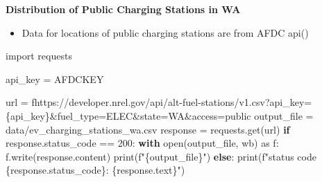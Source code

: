 \documentclass[
  letterpaper,
  DIV=11,
  numbers=noendperiod]{scrartcl}
\newenvironment{Shaded}{\begin{snugshade}}{\end{snugshade}}
\newcommand{\BuiltInTok}[1]{\textcolor[rgb]{0.00,0.23,0.31}{#1}}
\newcommand{\ControlFlowTok}[1]{\textcolor[rgb]{0.00,0.23,0.31}{\textbf{#1}}}
\newcommand{\DecValTok}[1]{\textcolor[rgb]{0.68,0.00,0.00}{#1}}
\newcommand{\ImportTok}[1]{\textcolor[rgb]{0.00,0.46,0.62}{#1}}
\newcommand{\NormalTok}[1]{\textcolor[rgb]{0.00,0.23,0.31}{#1}}
\newcommand{\OperatorTok}[1]{\textcolor[rgb]{0.37,0.37,0.37}{#1}}
\newcommand{\SpecialCharTok}[1]{\textcolor[rgb]{0.37,0.37,0.37}{#1}}
\newcommand{\SpecialStringTok}[1]{\textcolor[rgb]{0.13,0.47,0.30}{#1}}
\newcommand{\StringTok}[1]{\textcolor[rgb]{0.13,0.47,0.30}{#1}}
\providecommand{\tightlist}{%
  \setlength{\itemsep}{0pt}\setlength{\parskip}{0pt}}\usepackage{longtable,booktabs,array}
\begin{document}
\begin{tcolorbox}[enhanced jigsaw, rightrule=.15mm, bottomrule=.15mm, left=2mm, breakable, leftrule=.75mm, colback=white, opacityback=0, arc=.35mm, toprule=.15mm, colframe=quarto-callout-note-color-frame]
\begin{minipage}[t]{5.5mm}
\textcolor{quarto-callout-note-color}{\faInfo}
\end{minipage}%
\begin{minipage}[t]{\textwidth - 5.5mm}

\vspace{-3mm}\textbf{Distribution of Public Charging Stations in WA}\vspace{3mm}

\begin{itemize}
\tightlist
\item
  Data for locations of public charging stations are from AFDC
  api()
\end{itemize}

\begin{Shaded}
\begin{Highlighting}[]
\ImportTok{import}\NormalTok{ requests}

\NormalTok{api\_key }\OperatorTok{=}\NormalTok{ AFDCKEY}

\NormalTok{url }\OperatorTok{=} \SpecialStringTok{f\textquotesingle{}https://developer.nrel.gov/api/alt{-}fuel{-}stations/v1.csv?api\_key=}\SpecialCharTok{\{}\NormalTok{api\_key}\SpecialCharTok{\}}\SpecialStringTok{\&fuel\_type=ELEC\&state=WA\&access=public\textquotesingle{}}
\NormalTok{output\_file }\OperatorTok{=} \StringTok{\textquotesingle{}data/ev\_charging\_stations\_wa.csv\textquotesingle{}}
\NormalTok{response }\OperatorTok{=}\NormalTok{ requests.get(url)}
\ControlFlowTok{if}\NormalTok{ response.status\_code }\OperatorTok{==} \DecValTok{200}\NormalTok{:}
    \ControlFlowTok{with} \BuiltInTok{open}\NormalTok{(output\_file, }\StringTok{\textquotesingle{}wb\textquotesingle{}}\NormalTok{) }\ImportTok{as}\NormalTok{ f:}
\NormalTok{        f.write(response.content)}
    \BuiltInTok{print}\NormalTok{(}\SpecialStringTok{f"}\SpecialCharTok{\{}\NormalTok{output\_file}\SpecialCharTok{\}}\SpecialStringTok{"}\NormalTok{)}
\ControlFlowTok{else}\NormalTok{:}
    \BuiltInTok{print}\NormalTok{(}\SpecialStringTok{f"status code }\SpecialCharTok{\{}\NormalTok{response}\SpecialCharTok{.}\NormalTok{status\_code}\SpecialCharTok{\}}\SpecialStringTok{: }\SpecialCharTok{\{}\NormalTok{response}\SpecialCharTok{.}\NormalTok{text}\SpecialCharTok{\}}\SpecialStringTok{"}\NormalTok{)}
\end{Highlighting}
\end{Shaded}


\end{minipage}
\end{tcolorbox}
\end{document}
